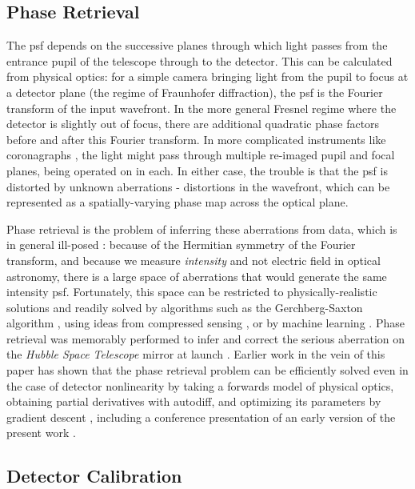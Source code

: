 \documentclass[]{spieman}
\begin{document}
\subsection{Phase Retrieval}
The \ac{psf} depends on the successive planes through which light passes from the entrance pupil of the telescope through to the detector. This can be calculated from physical optics: for a simple camera bringing light from the pupil to focus at a detector plane (the regime of Fraunhofer diffraction), the \ac{psf} is the Fourier transform of the input wavefront. In the more general Fresnel regime where the detector is slightly out of focus, there are additional quadratic phase factors before and after this Fourier transform. In more complicated instruments like coronagraphs \cite{Bowler2016}, the light might pass through multiple re-imaged pupil and focal planes, being operated on in each. In either case, the trouble is that the \ac{psf} is distorted by unknown aberrations - distortions in the wavefront, which can be represented as a spatially-varying phase map across the optical plane. 

Phase retrieval is the problem of inferring these aberrations from data\cite{schechtman2014}, which is in general ill-posed \cite{barnett2020}: because of the Hermitian symmetry of the Fourier transform, and because we measure \textit{intensity} and not electric field in optical astronomy, there is a large space of aberrations that would generate the same intensity \ac{psf}. Fortunately, this space can be restricted to physically-realistic solutions and readily solved by algorithms such as the Gerchberg-Saxton algorithm \cite{gerchberg1972}, using ideas from compressed sensing \cite{candes2011}, or by machine learning \cite{metzler2018,isil2019,nishizaki2020}.  Phase retrieval was memorably performed to infer and correct the serious aberration on the \textit{Hubble Space Telescope} mirror at launch \cite{hubble_phase_ret}. 
Earlier work in the vein of this paper has shown that the phase retrieval problem can be efficiently solved even in the case of detector nonlinearity by taking a forwards model of physical optics, obtaining partial derivatives with autodiff, and optimizing its parameters by gradient descent \cite{jurling_fienup,phase_ret_and_design}, including a conference presentation of an early version of the present work \cite{Desdoigts2022}.

\subsection{Detector Calibration}
\end{document}
